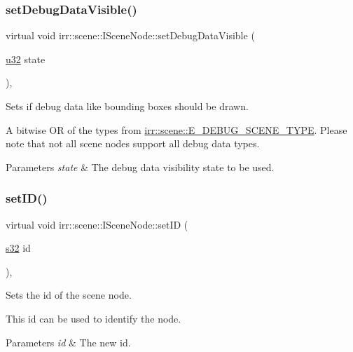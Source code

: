 \subsubsection{\texorpdfstring{set\+Debug\+Data\+Visible()}{setDebugDataVisible()}}
{\footnotesize\ttfamily virtual void irr\+::scene\+::\+I\+Scene\+Node\+::set\+Debug\+Data\+Visible (\begin{DoxyParamCaption}\item[{\hyperlink{namespaceirr_a0416a53257075833e7002efd0a18e804}{u32}}]{state }\end{DoxyParamCaption})\hspace{0.3cm}{\ttfamily [inline]}, {\ttfamily [virtual]}}



Sets if debug data like bounding boxes should be drawn. 

A bitwise OR of the types from \hyperlink{namespaceirr_1_1scene_a52b664c4c988113735042b168fc32dbe}{irr\+::scene\+::\+E\+\_\+\+D\+E\+B\+U\+G\+\_\+\+S\+C\+E\+N\+E\+\_\+\+T\+Y\+PE}. Please note that not all scene nodes support all debug data types. 
\begin{DoxyParams}{Parameters}
{\em state} & The debug data visibility state to be used. \\
\hline
\end{DoxyParams}
\mbox{\label{classirr_1_1scene_1_1ISceneNode_ade60c630c4768200b1d15debbd00fe0e}} 
\subsubsection{\texorpdfstring{set\+I\+D()}{setID()}}
{\footnotesize\ttfamily virtual void irr\+::scene\+::\+I\+Scene\+Node\+::set\+ID (\begin{DoxyParamCaption}\item[{\hyperlink{namespaceirr_ac66849b7a6ed16e30ebede579f9b47c6}{s32}}]{id }\end{DoxyParamCaption})\hspace{0.3cm}{\ttfamily [inline]}, {\ttfamily [virtual]}}



Sets the id of the scene node. 

This id can be used to identify the node. 
\begin{DoxyParams}{Parameters}
{\em id} & The new id. \\
\hline
\end{DoxyParams}
\mbox{\label{classirr_1_1scene_1_1ISceneNode_a7ceda3eb747a353ffeda02c26e697cbd}} 
